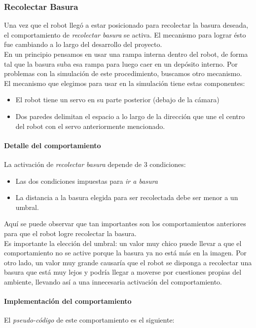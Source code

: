 \subsubsection{Recolectar Basura}
\label{collect_garbage}
Una vez que el robot lleg\'o a estar posicionado para recolectar la basura
deseada, el comportamiento de \emph{recolectar basura} se activa. El mecanismo
para lograr \'esto fue cambiando a lo largo del desarrollo del proyecto.
\\
En un principio pensamos en usar una rampa interna dentro del robot, de forma
tal que la basura suba esa rampa para luego caer en un dep\'osito interno.
Por problemas con la simulaci\'on de este procedimiento, buscamos otro
mecanismo.
\\
El mecanismo que elegimos para usar en la simulaci\'on tiene estas componentes:
\begin{itemize}
	\item El robot tiene un servo en su parte posterior (debajo de la c\'amara)
	\item Dos paredes delimitan el espacio a lo largo de la direcci\'on que une
			el centro del robot con el servo anteriormente mencionado.
\end{itemize}

\paragraph{Detalle del comportamiento}
La activaci\'on de \emph{recolectar basura} depende de 3 condiciones:
\begin{itemize}
	\item Las dos condiciones impuestas para \emph{ir a basura}
	\item La distancia a la basura elegida para ser recolectada debe ser menor a
			un umbral.
\end{itemize}

Aqu\'i se puede observar que tan importantes son los comportamientos anteriores
para que el robot logre recolectar la basura.
\\
Es importante la elecci\'on del umbral: un valor muy chico puede llevar a que el
comportamiento no se active porque la basura ya no est\'a m\'as en la imagen.
Por otro lado, un valor muy grande causar\'ia que el robot se disponga a
recolectar una basura que est\'a muy lejos y podr\'ia llegar a moverse por
cuestiones propias del ambiente, llevando as\'i a una innecesaria activaci\'on
del comportamiento.

\paragraph{Implementaci\'on del comportamiento}
El \emph{pseudo-c\'odigo} de este comportamiento es el siguiente:


